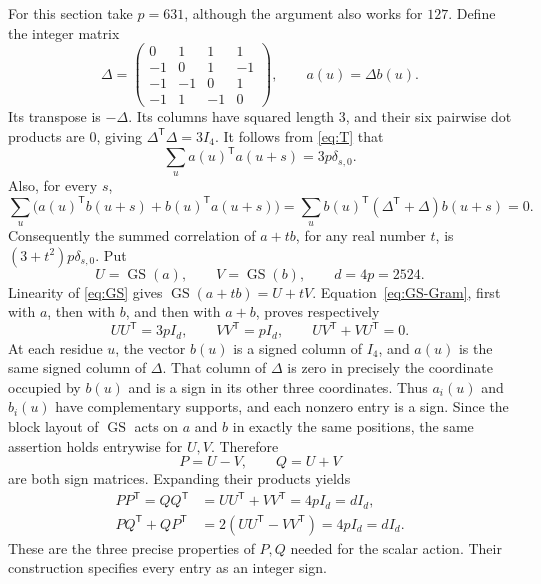 \documentclass[10pt]{article}
\newcommand{\GS}{\operatorname{GS}}
\begin{document}
For this section take $p=631$, although the argument also works for $127$.
Define the integer matrix
\[
 \Delta=\begin{pmatrix}
 0&1&1&1\\-1&0&1&-1\\-1&-1&0&1\\-1&1&-1&0
 \end{pmatrix},\qquad a(u)=\Delta b(u).
\]
Its transpose is $-\Delta$. Its columns have squared length $3$, and
their six pairwise dot products are $0$, giving
$\Delta^{\mathsf T}\Delta=3I_4$.
It follows from \eqref{eq:T} that
\[
 \sum_u a(u)^{\mathsf T}a(u+s)=3p\delta_{s,0}.
\]
Also, for every $s$,
\[
 \sum_u\bigl(a(u)^{\mathsf T}b(u+s)+b(u)^{\mathsf T}a(u+s)\bigr)
 =\sum_u b(u)^{\mathsf T}(\Delta^{\mathsf T}+\Delta)b(u+s)=0.
\]
Consequently the summed correlation of $a+t b$, for any real number $t$,
is $(3+t^2)p\delta_{s,0}$. Put
\[
 U=\GS(a),\qquad V=\GS(b),\qquad d=4p=2524.
\]
Linearity of \eqref{eq:GS} gives $\GS(a+t b)=U+tV$.
Equation~\eqref{eq:GS-Gram}, first with $a$, then with $b$, and then with
$a+b$, proves respectively
\[
 UU^{\mathsf T}=3pI_d,\qquad VV^{\mathsf T}=pI_d,\qquad
 UV^{\mathsf T}+VU^{\mathsf T}=0.
\]
At each residue $u$, the vector $b(u)$ is a signed column of $I_4$,
and $a(u)$ is the same signed column of $\Delta$.
That column of $\Delta$ is zero in precisely the coordinate occupied by
$b(u)$ and is a sign in its other three coordinates.
Thus $a_i(u)$ and $b_i(u)$ have complementary supports, and each nonzero
entry is a sign. Since the block layout of $\GS$ acts on $a$ and $b$
in exactly the same positions, the same assertion holds entrywise for
$U,V$. Therefore
\[
 P=U-V,\qquad Q=U+V
\]
are both sign matrices. Expanding their products yields
\begin{equation}\label{eq:frame}
 \begin{split}
 PP^{\mathsf T}=QQ^{\mathsf T}
 &=UU^{\mathsf T}+VV^{\mathsf T}=4pI_d=dI_d,\\
 PQ^{\mathsf T}+QP^{\mathsf T}
 &=2(UU^{\mathsf T}-VV^{\mathsf T})=4pI_d=dI_d.
 \end{split}
\end{equation}
These are the three precise properties of $P,Q$ needed for the scalar
action. Their construction specifies every entry as an integer sign.


\end{document}
